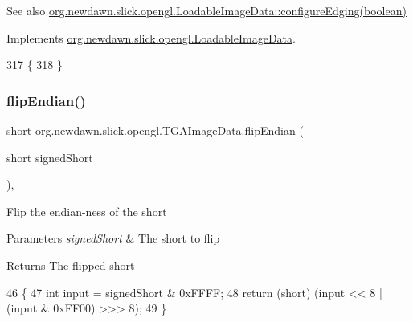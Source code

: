 \begin{DoxySeeAlso}{See also}
\mbox{\hyperlink{interfaceorg_1_1newdawn_1_1slick_1_1opengl_1_1_loadable_image_data_a1f9fb94bae3936761535408ba7afc0df}{org.\+newdawn.\+slick.\+opengl.\+Loadable\+Image\+Data\+::configure\+Edging(boolean)}} 
\end{DoxySeeAlso}


Implements \mbox{\hyperlink{interfaceorg_1_1newdawn_1_1slick_1_1opengl_1_1_loadable_image_data_a1f9fb94bae3936761535408ba7afc0df}{org.\+newdawn.\+slick.\+opengl.\+Loadable\+Image\+Data}}.


\begin{DoxyCode}
317                                                 \{
318     \}
\end{DoxyCode}
\mbox{\label{classorg_1_1newdawn_1_1slick_1_1opengl_1_1_t_g_a_image_data_a17a25f35cb763e4698de412c2ef34493}} 
\subsubsection{\texorpdfstring{flip\+Endian()}{flipEndian()}}
{\footnotesize\ttfamily short org.\+newdawn.\+slick.\+opengl.\+T\+G\+A\+Image\+Data.\+flip\+Endian (\begin{DoxyParamCaption}\item[{short}]{signed\+Short }\end{DoxyParamCaption})\hspace{0.3cm}{\ttfamily [inline]}, {\ttfamily [private]}}

Flip the endian-\/ness of the short


\begin{DoxyParams}{Parameters}
{\em signed\+Short} & The short to flip \\
\hline
\end{DoxyParams}
\begin{DoxyReturn}{Returns}
The flipped short 
\end{DoxyReturn}

\begin{DoxyCode}
46                                                 \{
47         \textcolor{keywordtype}{int} input = signedShort & 0xFFFF;
48         \textcolor{keywordflow}{return} (\textcolor{keywordtype}{short}) (input << 8 | (input & 0xFF00) >>> 8);
49     \}
\end{DoxyCode}
\mbox{\label{classorg_1_1newdawn_1_1slick_1_1opengl_1_1_t_g_a_image_data_ab9aff2ca0cec0b8ff114074236cdded1}} 
